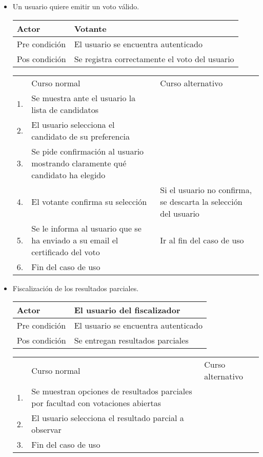 \begin{itemize}
\bigskip
\item Un usuario quiere emitir un voto v\'alido.
\begin{center}
\begin{tabular}{ll}
Actor & Votante \\
\hline
Pre condición & El usuario se encuentra autenticado \\
\hline
Pos condición & Se registra correctamente el voto del usuario \\
\hline
\end{tabular}
\medskip
\begin{tabular}{c p{4cm}|p{4cm}}
 & Curso normal & Curso alternativo \\
 1. & Se muestra ante el usuario la lista de candidatos &   \\
 2. & El usuario selecciona el candidato de su preferencia &   \\
 3. & Se pide confirmación al usuario mostrando claramente qué candidato ha elegido &   \\
 4. & El votante confirma su selección & Si el usuario no confirma, se descarta la selección del usuario  \\
 5. & Se le informa al usuario que se ha enviado a su e\-mail el certificado del voto & Ir al fin del caso de uso \\
 6. & Fin del caso de uso & \\
\end{tabular}
\end{center}

\bigskip
\item Fiscalizaci\'on de los resultados parciales.
\begin{center}
\begin{tabular}{ll}
Actor & El usuario del fiscalizador \\
\hline
Pre condición & El usuario se encuentra autenticado \\
\hline
Pos condición & Se entregan resultados parciales \\
\hline
\end{tabular}
\medskip
\begin{tabular}{c p{4cm}|p{4cm}}
 & Curso normal & Curso alternativo \\
 1. & Se muestran opciones de resultados parciales por facultad con votaciones abiertas &   \\
 2. & El usuario selecciona el resultado parcial a observar &   \\
 3. & Fin del caso de uso & \\
\end{tabular}
\end{center}



\end{itemize}
